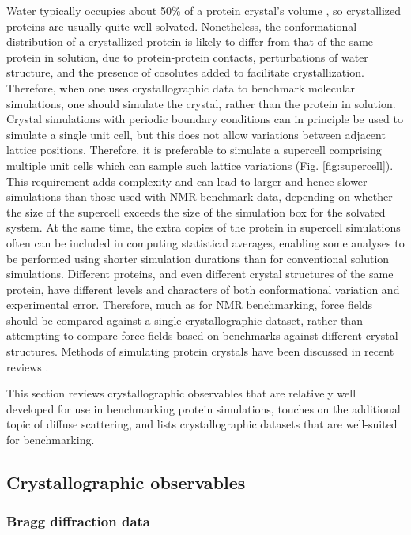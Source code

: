 \documentclass[9pt,review]{livecoms}
\begin{document}
Water typically occupies about 50\% of a protein crystal’s volume \cite{altan_learning_2018}, so crystallized proteins are usually quite well-solvated.
Nonetheless, the conformational distribution of a crystallized protein is likely to differ from that of the same protein in solution, due to protein-protein contacts, perturbations of water structure, and the presence of cosolutes added to facilitate crystallization.
Therefore, when one uses crystallographic data to benchmark molecular simulations, one should simulate the crystal, rather than the protein in solution.
Crystal simulations with periodic boundary conditions can in principle be used to simulate a single unit cell, but this does not allow variations between adjacent lattice positions.
Therefore, it is preferable to simulate a supercell comprising multiple unit cells which can sample such lattice variations (Fig. \ref{fig:supercell}).
This requirement adds complexity and can lead to larger and hence slower simulations than those used with NMR benchmark data, depending on whether the size of the supercell exceeds the size of the simulation box for the solvated system.
At the same time, the extra copies of the protein in supercell simulations often can be included in computing statistical averages, enabling some analyses to be performed using shorter simulation durations than for conventional solution simulations. 
Different proteins, and even different crystal structures of the same protein, have different levels and characters of both conformational variation and experimental error.
Therefore, much as for NMR benchmarking, force fields should be compared against a single crystallographic dataset, rather than attempting to compare force fields based on benchmarks against different crystal structures.
Methods of simulating protein crystals have been discussed in recent reviews \cite{cerutti_molecular_2019,wych_molecular-dynamics_2023}.

This section reviews crystallographic observables that are relatively well developed for use in benchmarking protein simulations, touches on the additional topic of diffuse scattering, and lists crystallographic datasets that are well-suited for benchmarking.

\subsection{Crystallographic observables}
\label{sub:xtal_obs}

\subsubsection{Bragg diffraction data}
\label{sub2:bragg}
\end{document}
